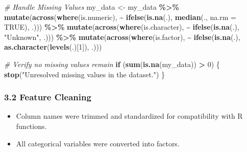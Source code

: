 \documentclass[
]{article}
\newenvironment{Shaded}{\begin{snugshade}}{\end{snugshade}}
\newcommand{\AttributeTok}[1]{\textcolor[rgb]{0.13,0.29,0.53}{#1}}
\newcommand{\CommentTok}[1]{\textcolor[rgb]{0.56,0.35,0.01}{\textit{#1}}}
\newcommand{\ConstantTok}[1]{\textcolor[rgb]{0.56,0.35,0.01}{#1}}
\newcommand{\ControlFlowTok}[1]{\textcolor[rgb]{0.13,0.29,0.53}{\textbf{#1}}}
\newcommand{\DecValTok}[1]{\textcolor[rgb]{0.00,0.00,0.81}{#1}}
\newcommand{\FunctionTok}[1]{\textcolor[rgb]{0.13,0.29,0.53}{\textbf{#1}}}
\newcommand{\NormalTok}[1]{#1}
\newcommand{\OtherTok}[1]{\textcolor[rgb]{0.56,0.35,0.01}{#1}}
\newcommand{\SpecialCharTok}[1]{\textcolor[rgb]{0.81,0.36,0.00}{\textbf{#1}}}
\newcommand{\StringTok}[1]{\textcolor[rgb]{0.31,0.60,0.02}{#1}}
\begin{document}
\begin{Shaded}
\begin{Highlighting}[]
\CommentTok{\# Handle Missing Values}
\NormalTok{my\_data }\OtherTok{\textless{}{-}}\NormalTok{ my\_data }\SpecialCharTok{\%\textgreater{}\%}
  \FunctionTok{mutate}\NormalTok{(}\FunctionTok{across}\NormalTok{(}\FunctionTok{where}\NormalTok{(is.numeric), }\SpecialCharTok{\textasciitilde{}} \FunctionTok{ifelse}\NormalTok{(}\FunctionTok{is.na}\NormalTok{(.), }\FunctionTok{median}\NormalTok{(., }\AttributeTok{na.rm =} \ConstantTok{TRUE}\NormalTok{), .))) }\SpecialCharTok{\%\textgreater{}\%}
  \FunctionTok{mutate}\NormalTok{(}\FunctionTok{across}\NormalTok{(}\FunctionTok{where}\NormalTok{(is.character), }\SpecialCharTok{\textasciitilde{}} \FunctionTok{ifelse}\NormalTok{(}\FunctionTok{is.na}\NormalTok{(.), }\StringTok{"Unknown"}\NormalTok{, .))) }\SpecialCharTok{\%\textgreater{}\%}
  \FunctionTok{mutate}\NormalTok{(}\FunctionTok{across}\NormalTok{(}\FunctionTok{where}\NormalTok{(is.factor), }\SpecialCharTok{\textasciitilde{}} \FunctionTok{ifelse}\NormalTok{(}\FunctionTok{is.na}\NormalTok{(.), }\FunctionTok{as.character}\NormalTok{(}\FunctionTok{levels}\NormalTok{(.)[}\DecValTok{1}\NormalTok{]), .)))}

\CommentTok{\# Verify no missing values remain}
\ControlFlowTok{if}\NormalTok{ (}\FunctionTok{sum}\NormalTok{(}\FunctionTok{is.na}\NormalTok{(my\_data)) }\SpecialCharTok{\textgreater{}} \DecValTok{0}\NormalTok{) \{}
  \FunctionTok{stop}\NormalTok{(}\StringTok{"Unresolved missing values in the dataset."}\NormalTok{)}
\NormalTok{\}}
\end{Highlighting}
\end{Shaded}

\subsubsection{\texorpdfstring{\textbf{3.2 Feature
Cleaning}}{3.2 Feature Cleaning}}\label{feature-cleaning}

\begin{itemize}
\item
  Column names were trimmed and standardized for compatibility with R
  functions.
\item
  All categorical variables were converted into factors.
\end{itemize}
\end{document}
